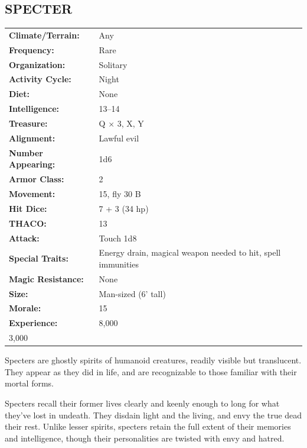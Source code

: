 \begin{multicols}{2}
\noindent
\begin{minipage}{\columnwidth}

\vspace{1em}

\subsection{SPECTER}

\noindent \begin{tabular}{p{}p{}}
\textbf{Climate/Terrain:}	& Any	\\
\textbf{Frequency:} 		& Rare	\\
\textbf{Organization:} 		& Solitary	\\
\textbf{Activity Cycle:} 	& Night	\\
\textbf{Diet:} 				& None	\\
\textbf{Intelligence:} 		& 13--14	\\
\textbf{Treasure:} 			& Q $\times$ 3, X, Y	\\
\textbf{Alignment:} 		& Lawful evil	\\
\hline
\textbf{Number Appearing:} 	& 1d6	\\
\textbf{Armor Class:} 		& 2	\\
\textbf{Movement:} 			& 15, fly 30 B	\\
\textbf{Hit Dice:} 			& 7 + 3 (34 hp)	\\
\textbf{THACO:} 			& 13	\\
\textbf{Attack:} 			& Touch 1d8	\\
\textbf{Special Traits:} & Energy drain, magical weapon needed to hit, spell immunities	\\
\textbf{Magic Resistance:} 	& None	\\
\textbf{Size:} 				& Man-sized (6' tall)	\\
\textbf{Morale:} 			& 15	\\
\textbf{Experience:} 		& 8,000	\\ 3,000
\end{tabular}

\end{minipage}

Specters are ghostly spirits of humanoid creatures, readily visible but translucent. They appear as they did in life, and are recognizable to those familiar with their mortal forms.

Specters recall their former lives clearly and keenly enough to long for what they've lost in undeath. They disdain light and the living, and envy the true dead their rest. Unlike lesser spirits, specters retain the full extent of their memories and intelligence, though their personalities are twisted with envy and hatred. 


\end{multicols}
